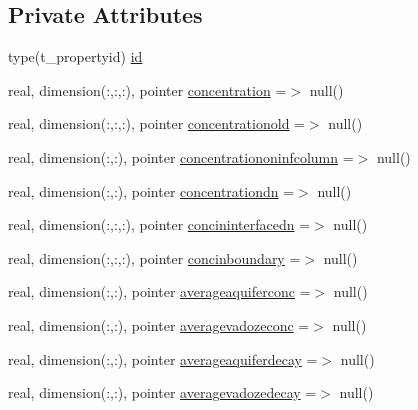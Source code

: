 \subsection*{Private Attributes}
\begin{DoxyCompactItemize}
\item 
type(t\+\_\+propertyid) \mbox{\hyperlink{structmoduleporousmediaproperties_1_1t__property_a3019ee54dc705aea8c8606934f0e88b7}{id}}
\item 
real, dimension(\+:,\+:,\+:), pointer \mbox{\hyperlink{structmoduleporousmediaproperties_1_1t__property_a3683d5b3064fc40f863c6fb41cc9c32c}{concentration}} =$>$ null()
\item 
real, dimension(\+:,\+:,\+:), pointer \mbox{\hyperlink{structmoduleporousmediaproperties_1_1t__property_aec24bc1dc57a41799a93e2c232bc12fd}{concentrationold}} =$>$ null()
\item 
real, dimension(\+:,\+:), pointer \mbox{\hyperlink{structmoduleporousmediaproperties_1_1t__property_a398b40f0062a766b0b4a2a27c9c242d7}{concentrationoninfcolumn}} =$>$ null()
\item 
real, dimension(\+:,\+:), pointer \mbox{\hyperlink{structmoduleporousmediaproperties_1_1t__property_a969065920512d1f9346b539f045eef09}{concentrationdn}} =$>$ null()
\item 
real, dimension(\+:,\+:,\+:), pointer \mbox{\hyperlink{structmoduleporousmediaproperties_1_1t__property_afadc62072ebc9852af22dd4152632289}{concininterfacedn}} =$>$ null()
\item 
real, dimension(\+:,\+:,\+:), pointer \mbox{\hyperlink{structmoduleporousmediaproperties_1_1t__property_a9997ceba7b0ee41a18d24a5a834c8281}{concinboundary}} =$>$ null()
\item 
real, dimension(\+:,\+:), pointer \mbox{\hyperlink{structmoduleporousmediaproperties_1_1t__property_aed01ce2ed0739958be83d9d1086b9180}{averageaquiferconc}} =$>$ null()
\item 
real, dimension(\+:,\+:), pointer \mbox{\hyperlink{structmoduleporousmediaproperties_1_1t__property_aea31afd951e04b4910e4b12135d055f0}{averagevadozeconc}} =$>$ null()
\item 
real, dimension(\+:,\+:), pointer \mbox{\hyperlink{structmoduleporousmediaproperties_1_1t__property_a5f990bea8f0a6e22bfc75e5c68f5da29}{averageaquiferdecay}} =$>$ null()
\item 
real, dimension(\+:,\+:), pointer \mbox{\hyperlink{structmoduleporousmediaproperties_1_1t__property_a2f0b30b28fceefb3bb33f8ceabbeae64}{averagevadozedecay}} =$>$ null()
\item 

\end{DoxyCompactItemize}
